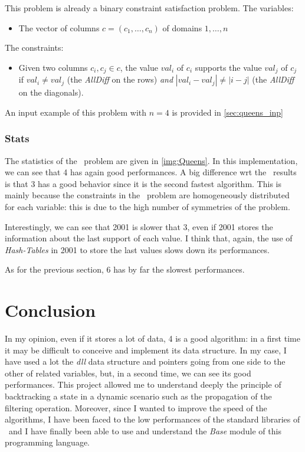 \documentclass{rapport}
\begin{document}
This problem is already a binary constraint satisfaction problem.
The variables:
\begin{itemize}
  \item The vector of columns $c = (c_1, \dots, c_n)$ of domains $1, \dots, n$
\end{itemize}

The constraints:
\begin{itemize}
  \item Given two columns $c_i, c_j \in c$, the value $val_i$ of $c_i$ supports the value $val_j$ of $c_j$ if $val_i \neq val_j$ (the \textit{AllDiff} on the rows) \textit{and} $|val_i - val_j| \neq |i - j|$ (the \textit{AllDiff} on the diagonals).
\end{itemize}

An input example of this problem with $n = 4$ is provided in \cref{sec:queens_inp}

\subsubsection{Stats}

The statistics of the \queens\ problem are given in \cref{img:Queens}. In this implementation, we can see that \ac{4} has again good performances. A big difference wrt the \allint\ results is that \ac{3} has a good behavior since it is the second fastest algorithm. This is mainly because the constraints in the \queens\ problem are homogeneously distributed for each variable: this is due to the high number of symmetries of the problem.

Interestingly, we can see that \ac{2001} is slower that \ac{3}, even if \ac{2001} stores the information about the last support of each value. I think that, again, the use of \textit{Hash-Tables} in \ac{2001} to store the last values slows down its performances.

As for the previous section, \ac{6} has by far the slowest performances.

\section{Conclusion}

In my opinion, even if it stores a lot of data, \ac{4} is a good algorithm: in a first time it may be difficult to conceive and implement its data structure. In my case, I have used a lot the \textit{dll} data structure and pointers going from one side to the other of related variables, but, in a second time, we can see its good performances. This project allowed me to understand deeply the principle of backtracking a state in a dynamic scenario such as the propagation of the filtering operation. Moreover, since I wanted to improve the speed of the algorithms, I have been faced to the low performances of the standard libraries of \ml\ and I have finally been able to use and understand the \textit{Base} module of this programming language.
\end{document}
